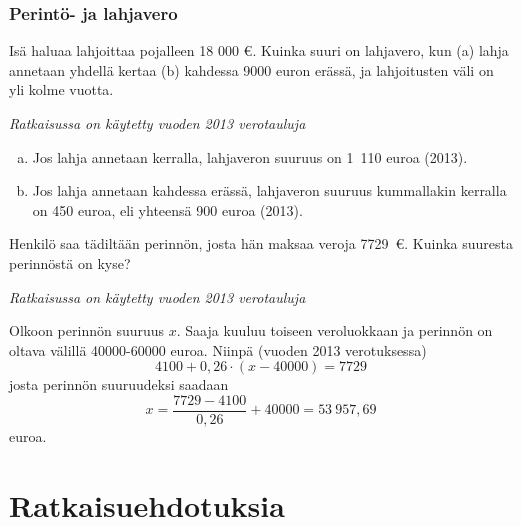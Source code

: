\documentclass[a4paper,10pt]{article}\usepackage[]{graphicx}\usepackage[]{color}
\begin{document}
\subsubsection*{Perintö- ja lahjavero}

\begin{question} Isä haluaa lahjoittaa pojalleen 18 000 \euro. Kuinka suuri on lahjavero, kun (a) lahja annetaan yhdellä kertaa (b) kahdessa 9000 euron erässä, ja lahjoitusten väli on yli kolme vuotta.
\end{question}
\begin{solution}
\emph{Ratkaisussa on käytetty vuoden 2013 verotauluja}

	\begin{enumerate}[(a)]
		\item Jos lahja annetaan kerralla, lahjaveron suuruus on 1~110 euroa (2013).
		\item Jos lahja annetaan kahdessa erässä, lahjaveron suuruus kummallakin kerralla on 450 euroa, eli yhteensä 900 euroa (2013). 
	\end{enumerate}
\end{solution}

\begin{question} Henkilö saa tädiltään perinnön, josta hän maksaa veroja 7729~\euro. Kuinka suuresta perinnöstä on kyse?
\end{question}
\begin{solution}
\emph{Ratkaisussa on käytetty vuoden 2013 verotauluja}

  Olkoon perinnön suuruus \(x\). Saaja kuuluu toiseen veroluokkaan ja perinnön on oltava välillä 40000-60000 euroa. Niinpä (vuoden 2013 verotuksessa)
\[
	4100 + 0,26\cdot(x - 40000) = 7729
\]
josta perinnön suuruudeksi saadaan
\[
	x = \frac{7729 - 4100}{0,26} + 40000 = 53~957{,}69 
\]
euroa.
\end{solution}


\newpage
\section*{Ratkaisuehdotuksia}
\printsolutions
\end{document}

